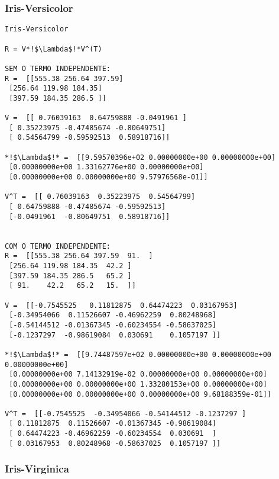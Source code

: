 \documentclass[a4paper,12pt,twoside]{article}
\begin{document}
\subsubsection{Iris-Versicolor}

\begin{lstlisting}
Iris-Versicolor

R = V*!$\Lambda$!*V^(T)

SEM O TERMO INDEPENDENTE: 
R =  [[555.38 256.64 397.59]
 [256.64 119.98 184.35]
 [397.59 184.35 286.5 ]]

V =  [[ 0.76039163  0.64759888 -0.0491961 ]
 [ 0.35223975 -0.47485674 -0.80649751]
 [ 0.54564799 -0.59592513  0.58918716]]

*!$\Lambda$!* =  [[9.59570396e+02 0.00000000e+00 0.00000000e+00]
 [0.00000000e+00 1.33162776e+00 0.00000000e+00]
 [0.00000000e+00 0.00000000e+00 9.57976568e-01]]

V^T =  [[ 0.76039163  0.35223975  0.54564799]
 [ 0.64759888 -0.47485674 -0.59592513]
 [-0.0491961  -0.80649751  0.58918716]]


COM O TERMO INDEPENDENTE: 
R =  [[555.38 256.64 397.59  91.  ]
 [256.64 119.98 184.35  42.2 ]
 [397.59 184.35 286.5   65.2 ]
 [ 91.    42.2   65.2   15.  ]]

V =  [[-0.7545525   0.11812875  0.64474223  0.03167953]
 [-0.34954066  0.11526607 -0.46962259  0.80248968]
 [-0.54144512 -0.01367345 -0.60234554 -0.58637025]
 [-0.1237297  -0.98619084  0.030691    0.1057197 ]]

*!$\Lambda$!* =  [[9.74487597e+02 0.00000000e+00 0.00000000e+00 0.00000000e+00]
 [0.00000000e+00 7.14132919e-02 0.00000000e+00 0.00000000e+00]
 [0.00000000e+00 0.00000000e+00 1.33280153e+00 0.00000000e+00]
 [0.00000000e+00 0.00000000e+00 0.00000000e+00 9.68188359e-01]]

V^T =  [[-0.7545525  -0.34954066 -0.54144512 -0.1237297 ]
 [ 0.11812875  0.11526607 -0.01367345 -0.98619084]
 [ 0.64474223 -0.46962259 -0.60234554  0.030691  ]
 [ 0.03167953  0.80248968 -0.58637025  0.1057197 ]]
\end{lstlisting}

\subsubsection{Iris-Virginica}
\end{document}

